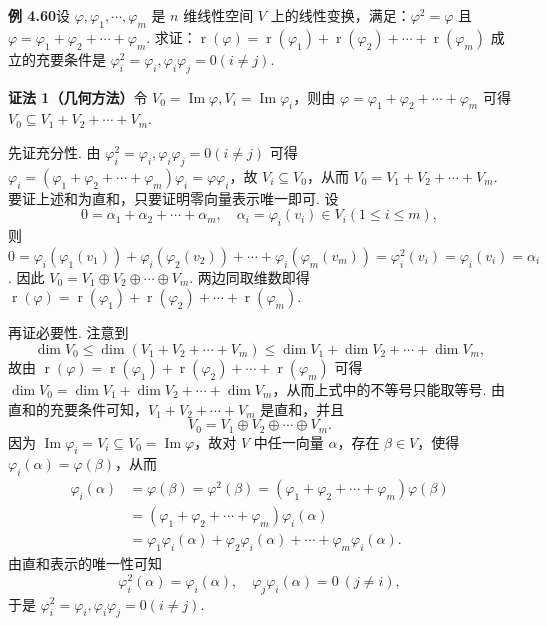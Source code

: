 \documentclass[UTF8, 12pt, fontset=fandol, oneside]{ctexart}
\begin{document}
\noindent\textbf{例 4.60}\quad 设 $\varphi,\varphi_1,\cdots,\varphi_m$ 是 $n$ 维线性空间 $V$ 上的线性变换，满足：$\varphi^2=\varphi$ 且 $\varphi=\varphi_1+\varphi_2+\cdots+\varphi_m$. 求证：$\operatorname{r}(\varphi)=\operatorname{r}(\varphi_1)+\operatorname{r}(\varphi_2)+\cdots+\operatorname{r}(\varphi_m)$ 成立的充要条件是 $\varphi_i^2=\varphi_i,\varphi_i\varphi_j=0(i\ne j)$.

\noindent\textbf{证法 1（几何方法）}\quad 令 $V_0=\operatorname{Im}\varphi,V_i=\operatorname{Im}\varphi_i$，则由 $\varphi=\varphi_1+\varphi_2+\cdots+\varphi_m$ 可得 $V_0\subseteq V_1+V_2+\cdots+V_m$.

先证充分性. 由 $\varphi_i^2=\varphi_i,\varphi_i\varphi_j=0(i\ne j)$ 可得 $\varphi_i=(\varphi_1+\varphi_2+\cdots+\varphi_m)\varphi_i=\varphi\varphi_i$，故 $V_i\subseteq V_0$，从而 $V_0=V_1+V_2+\cdots+V_m$. 要证上述和为直和，只要证明零向量表示唯一即可. 设
\[
0=\alpha_1+\alpha_2+\cdots+\alpha_m,\quad \alpha_i=\varphi_i(v_i)\in V_i(1\le i\le m),
\]
则 $0=\varphi_i(\varphi_1(v_1))+\varphi_i(\varphi_2(v_2))+\cdots+\varphi_i(\varphi_m(v_m))=\varphi_i^2(v_i)=\varphi_i(v_i)=\alpha_i$. 因此 $V_0=V_1\oplus V_2\oplus\cdots\oplus V_m$. 两边同取维数即得 $\operatorname{r}(\varphi)=\operatorname{r}(\varphi_1)+\operatorname{r}(\varphi_2)+\cdots+\operatorname{r}(\varphi_m)$.

再证必要性. 注意到
\[
\dim V_0\le\dim(V_1+V_2+\cdots+V_m)\le\dim V_1+\dim V_2+\cdots+\dim V_m,
\]
故由 $\operatorname{r}(\varphi)=\operatorname{r}(\varphi_1)+\operatorname{r}(\varphi_2)+\cdots+\operatorname{r}(\varphi_m)$ 可得 $\dim V_0=\dim V_1+\dim V_2+\cdots+\dim V_m$，从而上式中的不等号只能取等号. 由直和的充要条件可知，$V_1+V_2+\cdots+V_m$ 是直和，并且
\[
V_0=V_1\oplus V_2\oplus\cdots\oplus V_m.
\]
因为 $\operatorname{Im}\varphi_i=V_i\subseteq V_0=\operatorname{Im}\varphi$，故对 $V$ 中任一向量 $\alpha$，存在 $\beta\in V$，使得 $\varphi_i(\alpha)=\varphi(\beta)$，从而
\[
\begin{aligned}
\varphi_i(\alpha)
&=\varphi(\beta)=\varphi^2(\beta)=(\varphi_1+\varphi_2+\cdots+\varphi_m)\varphi(\beta)\\
&=(\varphi_1+\varphi_2+\cdots+\varphi_m)\varphi_i(\alpha)\\
&=\varphi_1\varphi_i(\alpha)+\varphi_2\varphi_i(\alpha)+\cdots+\varphi_m\varphi_i(\alpha).
\end{aligned}
\]
由直和表示的唯一性可知
\[
\varphi_i^2(\alpha)=\varphi_i(\alpha),\quad \varphi_j\varphi_i(\alpha)=0\ (j\ne i),
\]
于是 $\varphi_i^2=\varphi_i,\varphi_i\varphi_j=0(i\ne j)$.
\end{document}
